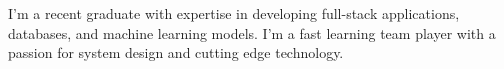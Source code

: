 \documentclass[letter,10pt]{article}
\begin{document}
\def\introstatement{I'm a recent graduate with expertise in developing full-stack applications, databases, and machine learning models. I'm a fast learning team player with a passion for system design and cutting edge technology.}


\begin{flushleft}
    \introstatement{}
\end{flushleft}
\end{document}
